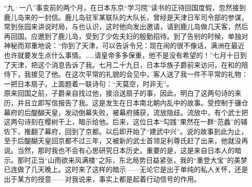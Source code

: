 “九·一八”事变前的两个月，在日本东京“学习院”读书的正待回国度假，忽然接到鹿儿岛来的一封信。鹿儿岛驻军某联队的大队长，曾经是天津日军司令部的参谋，常到张园来讲说时局，与也认识，这时他向发出邀请，请到鹿儿岛做几天客，然后再回国。应邀到了鹿儿岛，受到了少佐夫妇的殷勤招待。到了告别的时候，单独对神秘而郑重地说：“你到了天津，可以告诉令兄：现在闹的很不像话，满洲在最近也许就要发生点什么事情。……请皇帝多多保重，他不是没有希望的！”七月十日到了天津，把这个消息告诉了我。七月二十九日，日本华族子爵前来访问，在和的陪侍下，我接见了他。在这次平常的礼貌的会见中，客人送了我一件不平常的礼物：一把日本扇子，上面题着一联诗句：“天莫空，时非无”。\\

原来回国之前，子爵亲自找过他，接洽送扇子的事，因此，明白了这两句诗的来历，并且立即写信报告了我。这是发生在日本南北朝内乱中的故事。受控制于镰仓幕府的后醍醐天皇，发动倒幕失败，被幕府捕获，流放隐歧。流放中，有个武士把这两句诗刻在樱树干上，暗示给他。后来，这位日本“勾践”果然在一群“范蠡”的辅佐下，推翻了幕府，回到了京都。以后即开始了“建武中兴”。说的故事到此为止，至于后醍醐天皇回京都不过三年，又被新的武士首领足利尊氏赶了出来，他就没再说。当然，那时我也不会有心思研究日本历史。重要的是，这是来自日本人的暗示。那时正当“山雨欲来风满楼”之际，东北局势日益紧张，我的“重登大宝”的美梦已连做了几天晚上。这时来了这样的暗示——无论它是出于单纯的私人关怀，还是出于某方的授意——对我说来，事实上都是起着行动信号的作用。\\

